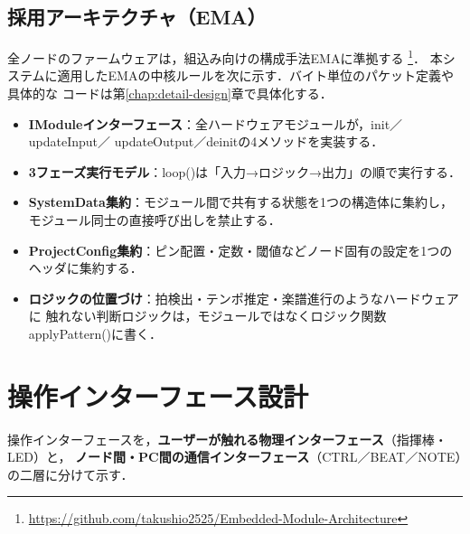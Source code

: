 \documentclass[lualatex,book,paper=a4paper,jafontsize=11.5pt,jafontscale=1.05]{jlreq}
\begin{document}
\subsection{採用アーキテクチャ（EMA）}
全ノードのファームウェアは，組込み向けの構成手法EMAに準拠する
\footnote{\url{https://github.com/takushio2525/Embedded-Module-Architecture}}．
本システムに適用したEMAの中核ルールを次に示す．バイト単位のパケット定義や具体的な
コードは第\ref{chap:detail-design}章で具体化する．
\begin{itemize}[leftmargin=1.4em, itemsep=2pt]
  \item \textbf{IModuleインターフェース}：全ハードウェアモジュールが，init／updateInput／
        updateOutput／deinitの4メソッドを実装する．
  \item \textbf{3フェーズ実行モデル}：loop()は「入力→ロジック→出力」の順で実行する．
  \item \textbf{SystemData集約}：モジュール間で共有する状態を1つの構造体に集約し，
        モジュール同士の直接呼び出しを禁止する．
  \item \textbf{ProjectConfig集約}：ピン配置・定数・閾値などノード固有の設定を1つのヘッダに集約する．
  \item \textbf{ロジックの位置づけ}：拍検出・テンポ推定・楽譜進行のようなハードウェアに
        触れない判断ロジックは，モジュールではなくロジック関数applyPattern()に書く．
\end{itemize}

\section{操作インターフェース設計}\label{sec:basic-ui}

操作インターフェースを，\textbf{ユーザーが触れる物理インターフェース}（指揮棒・LED）と，
\textbf{ノード間・PC間の通信インターフェース}（CTRL／BEAT／NOTE）の二層に分けて示す．
\end{document}
